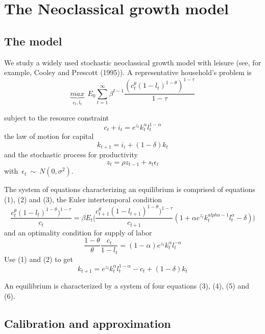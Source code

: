 \documentclass[a4paper,12pt]{scrartcl} %
\begin{document}
\section{The Neoclassical growth model} \label{sec:Section1}


\subsection{The model}

We study a widely used stochastic neoclassical growth model with leisure (see, for example, Cooley and Prescott
(1995)). A representative household’s problem is
$$\underbrace{max}_{c_t,l_t}~~E_0\sum_{t=1}^{\infty}\beta^{t-1}\frac{(c_t^\theta(1-l_t)^{1-\theta})^{1-\tau}}{1-\tau}$$

subject to the resource constraint
\begin{equation}\label{1}
  c_t+i_t=e^{z_t}k_t^{\alpha}l_t^{1-\alpha}
\end{equation}
the law of motion for capital
\begin{equation}\label{2}
  k_{t+1}=i_i+(1-\delta)k_t
\end{equation}
and the stochastic process for productivity
\begin{equation}\label{3}
   z_t=\rho z_{t-1}+s_t\epsilon_t
\end{equation}
with~$\epsilon_t~\sim ~N(0,\sigma^2).$

The system of equations characterizing an equilibrium is comprised of equations (1), (2) and (3), the Euler intertemporal condition
\begin{equation}\label{4}
   \frac{c_t^\theta(1-l_t)^{1-\theta})^{1-\tau}}{c_t}=\beta E_t\lgroup\frac{c_{t+1}^\theta(1-l_{t+1})^{1-\theta})^{1-\tau}}{c_{t+1}}(1+\alpha e^{z_t}k_t^{alpha-1}l_t^{\alpha}-\delta)\rgroup
\end{equation}
and an optimality condition for supply of labor
\begin{equation}\label{5}
   \frac{1-\theta}{\theta}\frac{c_t}{1-l_t}=(1-\alpha)e^{z_t}k_t^{\alpha}l_t^{-\alpha}
\end{equation}
Use (1) and (2) to get
\begin{equation}\label{6}
   k_{t+1}=e^{z_t}k_t^{\alpha}l_t^{1-\alpha}-c_t+(1-\delta)k_t
\end{equation}

An equilibrium is characterized by a system of four equations (3), (4), (5) and (6).

\subsection{Calibration and approximation}
\end{document}
